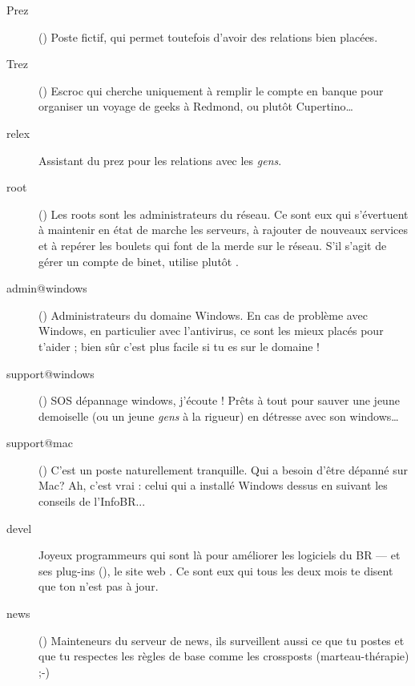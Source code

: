\begin{description}

  \item[Prez]{() Poste fictif, qui permet toutefois d'avoir
des relations bien plac\'ees.}

  \item[Trez]{() Escroc qui cherche uniquement \`a remplir le compte en banque pour organiser un voyage de geeks \`a Redmond, ou plut\^ot Cupertino\dots}

  \item[relex]{Assistant du prez pour les relations avec les \emph{gens}.}

  \item[root]{() Les roots sont les administrateurs du r\'eseau. Ce sont eux qui s'\'evertuent \`a maintenir en \'etat de marche les serveurs, \`a rajouter de nouveaux services et \`a rep\'erer les boulets qui font de la merde sur le r\'eseau. S'il s'agit de g\'erer un compte de binet, utilise plut\^ot .}

  \item[admin@windows] {() Administrateurs du domaine Windows. En cas de probl\`eme avec Windows, en particulier avec l'antivirus, ce sont les mieux plac\'es pour t'aider ; bien s\^ur c'est plus facile si tu es sur le domaine !
}
  \item[support@windows] {() SOS d\'epannage windows, j'\'ecoute ! Pr\^ets \`a tout pour sauver une jeune demoiselle (ou un jeune \emph{gens} \`a la rigueur) en d\'etresse avec son windows\dots }

  \item[support@mac] {() C'est un poste naturellement tranquille. Qui a besoin d'\^etre d\'epann\'e sur Mac? Ah, c'est vrai : celui qui a install\'e Windows dessus en suivant les conseils de l'InfoBR... }

  \item[devel]{Joyeux programmeurs qui sont l\`a pour am\'eliorer les logiciels du BR ---  et ses plug-ins (), le site web . Ce sont eux qui tous les deux mois te disent que ton  n'est pas \`a jour.}

  \item[news] {() Mainteneurs du serveur de news, ils surveillent aussi ce que tu postes et que tu respectes les r\`egles de base comme les crossposts (marteau-th\'erapie) \mbox{;-)}}


\end{description}
